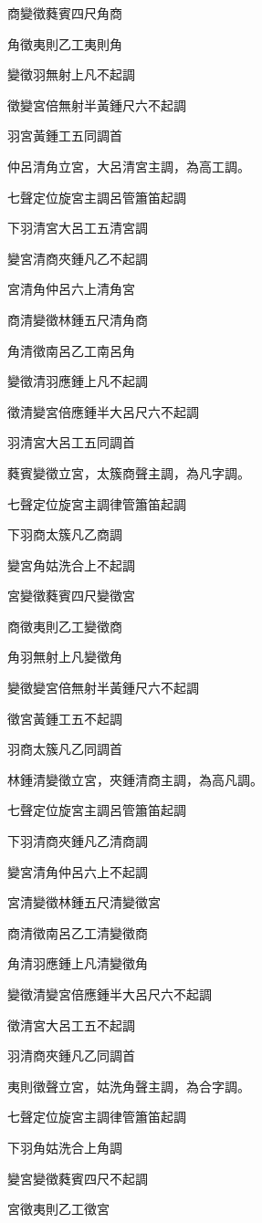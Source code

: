 \begin{pinyinscope}
商變徵蕤賓四尺角商

角徵夷則乙工夷則角

變徵羽無射上凡不起調

徵變宮倍無射半黃鍾尺六不起調

羽宮黃鍾工五同調首

仲呂清角立宮，大呂清宮主調，為高工調。

七聲定位旋宮主調呂管簫笛起調

下羽清宮大呂工五清宮調

變宮清商夾鍾凡乙不起調

宮清角仲呂六上清角宮

商清變徵林鍾五尺清角商

角清徵南呂乙工南呂角

變徵清羽應鍾上凡不起調

徵清變宮倍應鍾半大呂尺六不起調

羽清宮大呂工五同調首

蕤賓變徵立宮，太簇商聲主調，為凡字調。

七聲定位旋宮主調律管簫笛起調

下羽商太簇凡乙商調

變宮角姑洗合上不起調

宮變徵蕤賓四尺變徵宮

商徵夷則乙工變徵商

角羽無射上凡變徵角

變徵變宮倍無射半黃鍾尺六不起調

徵宮黃鍾工五不起調

羽商太簇凡乙同調首

林鍾清變徵立宮，夾鍾清商主調，為高凡調。

七聲定位旋宮主調呂管簫笛起調

下羽清商夾鍾凡乙清商調

變宮清角仲呂六上不起調

宮清變徵林鍾五尺清變徵宮

商清徵南呂乙工清變徵商

角清羽應鍾上凡清變徵角

變徵清變宮倍應鍾半大呂尺六不起調

徵清宮大呂工五不起調

羽清商夾鍾凡乙同調首

夷則徵聲立宮，姑洗角聲主調，為合字調。

七聲定位旋宮主調律管簫笛起調

下羽角姑洗合上角調

變宮變徵蕤賓四尺不起調

宮徵夷則乙工徵宮


\end{pinyinscope}
